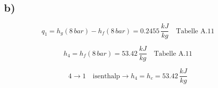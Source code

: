 

\subsection*{b)}

\[
q_1 = h_{g}(8 \, bar) - h_f(8 \, bar) = 0.2455 \, \frac{kJ}{kg} \quad \text{Tabelle A.11}
\]

\[
h_4 = h_f(8 \, bar) = 53.42 \, \frac{kJ}{kg} \quad \text{Tabelle A.11}
\]

\[
4 \rightarrow 1 \quad \text{isenthalp} \rightarrow h_4 = h_c = 53.42 \, \frac{kJ}{kg}
\]